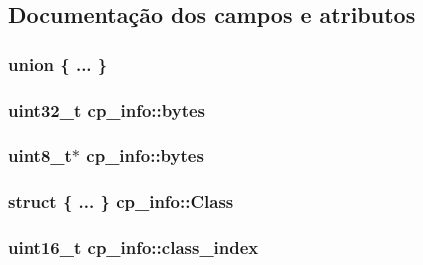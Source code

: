 \subsection{Documentação dos campos e atributos}
\subsubsection[{\texorpdfstring{"@1}{@1}}]{\setlength{\rightskip}{0pt plus 5cm}union \{ ... \} }\hypertarget{structcp__info_ab2df10b8ac24e6e4dc2e383a68c00447}{}\label{structcp__info_ab2df10b8ac24e6e4dc2e383a68c00447}
\subsubsection[{\texorpdfstring{bytes}{bytes}}]{\setlength{\rightskip}{0pt plus 5cm}uint32\+\_\+t cp\+\_\+info\+::bytes}\hypertarget{structcp__info_a34ed0f597e452fbeb97cb0f551a678bb}{}\label{structcp__info_a34ed0f597e452fbeb97cb0f551a678bb}
\subsubsection[{\texorpdfstring{bytes}{bytes}}]{\setlength{\rightskip}{0pt plus 5cm}uint8\+\_\+t$\ast$ cp\+\_\+info\+::bytes}\hypertarget{structcp__info_a34c1da9248b884af89b5c91d55087100}{}\label{structcp__info_a34c1da9248b884af89b5c91d55087100}
\subsubsection[{\texorpdfstring{Class}{Class}}]{\setlength{\rightskip}{0pt plus 5cm}struct \{ ... \}   cp\+\_\+info\+::\+Class}\hypertarget{structcp__info_aeb14fdcb3ba2363a18f2ecbeac15ac41}{}\label{structcp__info_aeb14fdcb3ba2363a18f2ecbeac15ac41}
\subsubsection[{\texorpdfstring{class\+\_\+index}{class_index}}]{\setlength{\rightskip}{0pt plus 5cm}uint16\+\_\+t cp\+\_\+info\+::class\+\_\+index}\hypertarget{structcp__info_ab2b48e96f2178c47f9f6b683c9b2fc59}{}\label{structcp__info_ab2b48e96f2178c47f9f6b683c9b2fc59}
